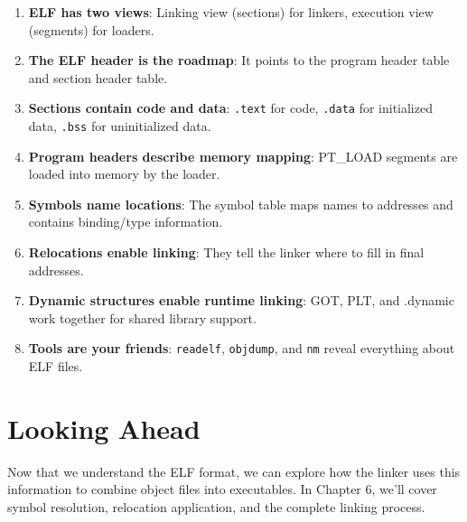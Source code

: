 \begin{enumerate}
    \item \textbf{ELF has two views}: Linking view (sections) for linkers, execution view (segments) for loaders.
    \item \textbf{The ELF header is the roadmap}: It points to the program header table and section header table.
    \item \textbf{Sections contain code and data}: \texttt{.text} for code, \texttt{.data} for initialized data, \texttt{.bss} for uninitialized data.
    \item \textbf{Program headers describe memory mapping}: PT\_LOAD segments are loaded into memory by the loader.
    \item \textbf{Symbols name locations}: The symbol table maps names to addresses and contains binding/type information.
    \item \textbf{Relocations enable linking}: They tell the linker where to fill in final addresses.
    \item \textbf{Dynamic structures enable runtime linking}: GOT, PLT, and .dynamic work together for shared library support.
    \item \textbf{Tools are your friends}: \texttt{readelf}, \texttt{objdump}, and \texttt{nm} reveal everything about ELF files.
\end{enumerate}

\section{Looking Ahead}

Now that we understand the ELF format, we can explore how the linker uses this information to combine object files into executables. In Chapter 6, we'll cover symbol resolution, relocation application, and the complete linking process.
